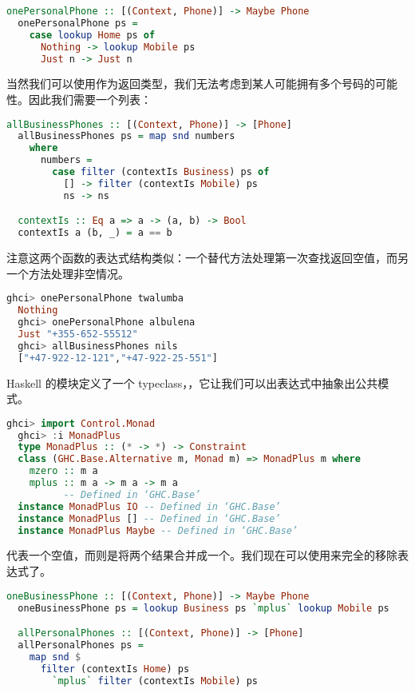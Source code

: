 \documentclass[./main.tex]{subfiles}
\begin{document}
\begin{lstlisting}[language=Haskell]
  onePersonalPhone :: [(Context, Phone)] -> Maybe Phone
  onePersonalPhone ps =
    case lookup Home ps of
      Nothing -> lookup Mobile ps
      Just n -> Just n
\end{lstlisting}

当然我们可以使用作为返回类型，我们无法考虑到某人可能拥有多个号码的可能性。因此我们需要一个列表：

\begin{lstlisting}[language=Haskell]
  allBusinessPhones :: [(Context, Phone)] -> [Phone]
  allBusinessPhones ps = map snd numbers
    where
      numbers =
        case filter (contextIs Business) ps of
          [] -> filter (contextIs Mobile) ps
          ns -> ns

  contextIs :: Eq a => a -> (a, b) -> Bool
  contextIs a (b, _) = a == b
\end{lstlisting}

注意这两个函数的表达式结构类似：一个替代方法处理第一次查找返回空值，而另一个方法处理非空情况。

\begin{lstlisting}[language=Haskell]
  ghci> onePersonalPhone twalumba
  Nothing
  ghci> onePersonalPhone albulena
  Just "+355-652-55512"
  ghci> allBusinessPhones nils
  ["+47-922-12-121","+47-922-25-551"]
\end{lstlisting}

Haskell 的模块定义了一个 typeclass，，它让我们可以出表达式中抽象出公共模式。

\begin{lstlisting}[language=Haskell]
  ghci> import Control.Monad
  ghci> :i MonadPlus
  type MonadPlus :: (* -> *) -> Constraint
  class (GHC.Base.Alternative m, Monad m) => MonadPlus m where
    mzero :: m a
    mplus :: m a -> m a -> m a
          -- Defined in ‘GHC.Base’
  instance MonadPlus IO -- Defined in ‘GHC.Base’
  instance MonadPlus [] -- Defined in ‘GHC.Base’
  instance MonadPlus Maybe -- Defined in ‘GHC.Base’
\end{lstlisting}

代表一个空值，而则是将两个结果合并成一个。我们现在可以使用来完全的移除表达式了。

\begin{lstlisting}[language=Haskell]
  oneBusinessPhone :: [(Context, Phone)] -> Maybe Phone
  oneBusinessPhone ps = lookup Business ps `mplus` lookup Mobile ps

  allPersonalPhones :: [(Context, Phone)] -> [Phone]
  allPersonalPhones ps =
    map snd $
      filter (contextIs Home) ps
        `mplus` filter (contextIs Mobile) ps
\end{lstlisting}
\end{document}
